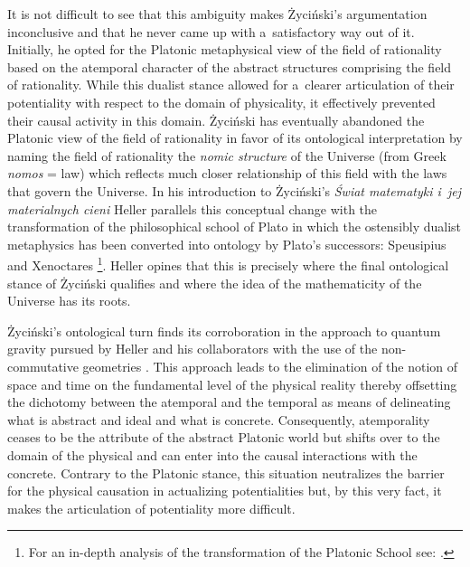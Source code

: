 It is not difficult to see that this ambiguity makes Życiński's argumentation inconclusive and that he never came up with a~satisfactory way out of it. Initially, he opted for the Platonic metaphysical view of the field of rationality based on the atemporal character of the abstract structures comprising the field of rationality. While this dualist stance allowed for a~clearer articulation of their potentiality with respect to the domain of physicality, it effectively prevented their causal activity in this domain. Życiński 
\parencite*[][pp.58–59]{zycinski_pole_2006} %
 has eventually abandoned the Platonic view of the field of rationality in favor of its ontological interpretation by naming the field of rationality the \textit{nomic structure} of the Universe (from Greek \textit{nomos} = law) which reflects much closer relationship of this field with the laws that govern the Universe. In his introduction to Życiński's \textit{Świat matematyki i~jej materialnych cieni} Heller parallels this conceptual change with the transformation of the philosophical school of Plato in which the ostensibly dualist metaphysics has been converted into ontology by Plato's successors: Speusipius and Xenoctares 
\parencite[][]{zycinski_wstep_2013}%
\footnote{For an in-depth analysis of the transformation of the Platonic School see: 
\parencites[][]{dembinski_pozny_2010}[see also 201][]{}[][]{}.%
}. Heller opines that this is precisely where the final ontological stance of Życiński qualifies and where the idea of the mathematicity of the Universe has its roots.



Życiński's ontological turn finds its corroboration in the approach to quantum gravity pursued by Heller and his collaborators with the use of the non-commutative geometries 
\parencites[][]{heller_emergence_1998}[][pp.115–122]{heller_poczatek_2002}. %
 This approach leads to the elimination of the notion of space and time on the fundamental level of the physical reality thereby offsetting the dichotomy between the atemporal and the temporal as means of delineating what is abstract and ideal and what is concrete. Consequently, atemporality ceases to be the attribute of the abstract Platonic world but shifts over to the domain of the physical and can enter into the causal interactions with the concrete. Contrary to the Platonic stance, this situation neutralizes the barrier for the physical causation in actualizing potentialities but, by this very fact, it makes the articulation of potentiality more difficult.



